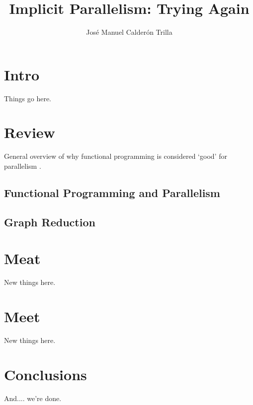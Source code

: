 \documentclass[justified]{tufte-book}
\title{Implicit Parallelism: Trying Again}
\author{Jos\'{e} Manuel Calder\'{o}n Trilla}
\newcommand{\blankpage}{\newpage\hbox{}\thispagestyle{empty}\newpage}
\begin{document}
\frontmatter

\blankpage

\maketitle

\tableofcontents
\listoffigures
\listoftables

\chapter{Intro}

    Things go here.

\chapter{Review}


    General overview of why functional programming is considered `good' for
    parallelism \citep{hughes:thesis}.
    \section{Functional Programming and Parallelism}
    
    
    \section{Graph Reduction}
    

\chapter{Meat}

    New things here.
    
\chapter{Meet}

    New things here.

\chapter{Conclusions}

    And.... we're done.

\backmatter



\end{document}

